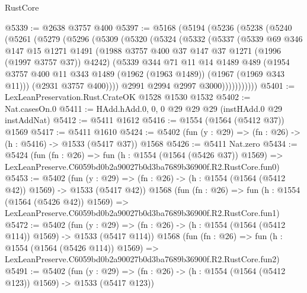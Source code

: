\begin{lexlean}{RustCore}
\begin{coremodule}
@5339 := @2638 @3757 @400
@5397 := @5168
    (@5194
      (@5236
        (@5238
          (@5240
            (@5261
              (@5279
                (@5296
                  (@5309
                    (@5320
                      (@5324
                        (@5332
                          (@5337
                            (@5339
                              @69
                              @346
                              @147
                              @15
                              @1271
                              @1491
                              (@1988 @3757 @400 @37 @147 @37 @1271 (@1996 (@1997 @3757 @37)) @4242)
                              (@5339
                                @344
                                @71
                                @11
                                @14
                                @1489
                                @489
                                (@1954
                                  @3757
                                  @400
                                  @11
                                  @343
                                  @1489
                                  (@1962 (@1963 @1489))
                                  (@1967 (@1969 @343 @11)))
                                (@2931 @3757 @400))))
                          @2991
                          @2994
                          @2997
                          @3000)))))))))))
@5401 := LexLeanPreservation.Rust.CrateOK @1528 @1530 @1532
@5402 := Nat.casesOn.{0}
@5411 := HAdd.hAdd.{0, 0, 0} @29 @29 @29 (instHAdd.{0} @29 instAddNat)
@5412 := @5411 @1612
@5416 := @1554 (@1564 (@5412 @37)) @1569
@5417 := @5411 @1610
@5424 := @5402 (fun (y : @29) => (fn : @26) -> (h : @5416) -> @1533 (@5417 @37)) @1568
@5426 := @5411 Nat.zero
@5434 := @5424
    (fun (fn : @26) =>
    fun (h : @1554 (@1564 (@5426 @37)) @1569) =>
    LexLeanPreserve.C6059bd0b2a90027b0d3ba7689b36900f.R2.RustCore.fun0)
@5453 := @5402
    (fun (y : @29) => (fn : @26) -> (h : @1554 (@1564 (@5412 @42)) @1569) -> @1533 (@5417 @42))
    @1568
    (fun (fn : @26) =>
    fun (h : @1554 (@1564 (@5426 @42)) @1569) =>
    LexLeanPreserve.C6059bd0b2a90027b0d3ba7689b36900f.R2.RustCore.fun1)
@5472 := @5402
    (fun (y : @29) => (fn : @26) -> (h : @1554 (@1564 (@5412 @114)) @1569) -> @1533 (@5417 @114))
    @1568
    (fun (fn : @26) =>
    fun (h : @1554 (@1564 (@5426 @114)) @1569) =>
    LexLeanPreserve.C6059bd0b2a90027b0d3ba7689b36900f.R2.RustCore.fun2)
@5491 := @5402
    (fun (y : @29) => (fn : @26) -> (h : @1554 (@1564 (@5412 @123)) @1569) -> @1533 (@5417 @123))

\end{coremodule}
\end{lexlean}
